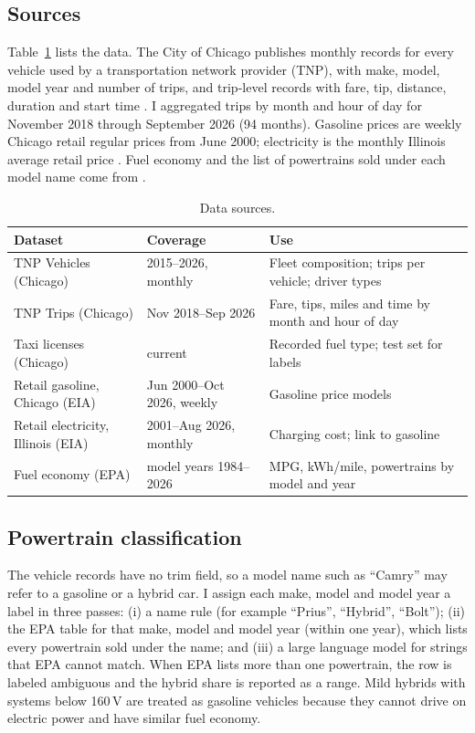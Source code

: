\documentclass[11pt]{article}
\begin{document}
\subsection{Sources}

Table~\ref{tab:data} lists the data. The City of Chicago publishes monthly records for every vehicle used by a transportation network provider (TNP), with make, model, model year and number of trips, and trip-level records with fare, tip, distance, duration and start time \citep{chicagotnp}. I aggregated trips by month and hour of day for November 2018 through September 2026 (94 months). Gasoline prices are weekly Chicago retail regular prices from June 2000; electricity is the monthly Illinois average retail price \citep{eia2026}. Fuel economy and the list of powertrains sold under each model name come from \citet{epa2026}.

\begin{table}[ht]
\centering
\caption{Data sources.}\label{tab:data}
\small
\begin{tabularx}{\textwidth}{@{}l l X@{}}
\toprule
Dataset & Coverage & Use \\
\midrule
TNP Vehicles (Chicago) & 2015--2026, monthly & Fleet composition; trips per vehicle; driver types \\
TNP Trips (Chicago) & Nov 2018--Sep 2026 & Fare, tips, miles and time by month and hour of day \\
Taxi licenses (Chicago) & current & Recorded fuel type; test set for labels \\
Retail gasoline, Chicago (EIA) & Jun 2000--Oct 2026, weekly & Gasoline price models \\
Retail electricity, Illinois (EIA) & 2001--Aug 2026, monthly & Charging cost; link to gasoline \\
Fuel economy (EPA) & model years 1984--2026 & MPG, kWh/mile, powertrains by model and year \\
\bottomrule
\end{tabularx}
\end{table}

\subsection{Powertrain classification}

The vehicle records have no trim field, so a model name such as ``Camry'' may refer to a gasoline or a hybrid car. I assign each make, model and model year a label in three passes: (i) a name rule (for example ``Prius'', ``Hybrid'', ``Bolt''); (ii) the EPA table for that make, model and model year (within one year), which lists every powertrain sold under the name; and (iii) a large language model for strings that EPA cannot match. When EPA lists more than one powertrain, the row is labeled ambiguous and the hybrid share is reported as a range. Mild hybrids with systems below 160\,V are treated as gasoline vehicles because they cannot drive on electric power and have similar fuel economy.
\end{document}
